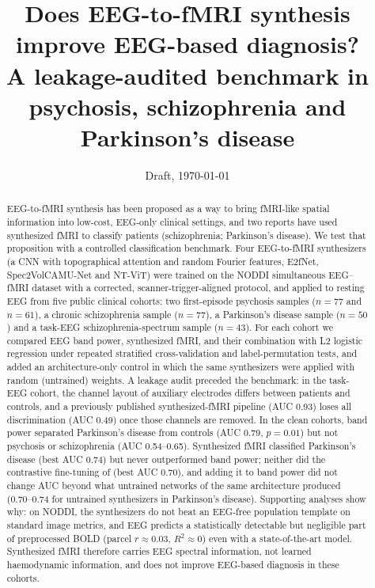 \documentclass[11pt]{article}
\title{Does EEG-to-fMRI synthesis improve EEG-based diagnosis?\\
A leakage-audited benchmark in psychosis, schizophrenia and Parkinson's disease}
\author{\todo{authors and affiliations}}
\date{Draft, \today}
\begin{document}
\maketitle

\begin{abstract}
EEG-to-fMRI synthesis has been proposed as a way to bring fMRI-like spatial information into low-cost, EEG-only clinical settings, and two reports have used synthesized fMRI to classify patients (schizophrenia; Parkinson's disease).
We test that proposition with a controlled classification benchmark.
Four EEG-to-fMRI synthesizers (a CNN with topographical attention and random Fourier features, E2fNet, Spec2VolCAMU-Net and NT-ViT) were trained on the NODDI simultaneous EEG--fMRI dataset with a corrected, scanner-trigger-aligned protocol, and applied to resting EEG from five public clinical cohorts:
two first-episode psychosis samples ($n=77$ and $n=61$), a chronic schizophrenia sample ($n=77$), a Parkinson's disease sample ($n=50$) and a task-EEG schizophrenia-spectrum sample ($n=43$).
For each cohort we compared EEG band power, synthesized fMRI, and their combination with L2 logistic regression under repeated stratified cross-validation and label-permutation tests, and added an architecture-only control in which the same synthesizers were applied with random (untrained) weights.
A leakage audit preceded the benchmark: in the task-EEG cohort, the channel layout of auxiliary electrodes differs between patients and controls, and a previously published synthesized-fMRI pipeline (AUC 0.93) loses all discrimination (AUC 0.49) once those channels are removed.
In the clean cohorts, band power separated Parkinson's disease from controls (AUC 0.79, $p=0.01$) but not psychosis or schizophrenia (AUC 0.54--0.65).
Synthesized fMRI classified Parkinson's disease (best AUC 0.74) but never outperformed band power; neither did the contrastive fine-tuning of \citet{calhas2023medrxiv} (best AUC 0.70), and adding it to band power did not change AUC beyond what untrained networks of the same architecture produced (0.70--0.74 for untrained synthesizers in Parkinson's disease).
Supporting analyses show why: on NODDI, the synthesizers do not beat an EEG-free population template on standard image metrics, and EEG predicts a statistically detectable but negligible part of preprocessed BOLD (parcel $r\approx0.03$, $R^2\approx0$) even with a state-of-the-art model.
Synthesized fMRI therefore carries EEG spectral information, not learned haemodynamic information, and does not improve EEG-based diagnosis in these cohorts.
\end{abstract}
\end{document}
